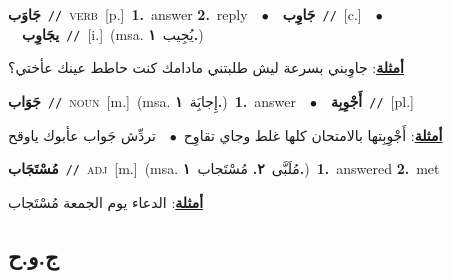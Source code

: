 \documentclass[10pt,a4paper,twoside]{article} %
\begin{document}
\begin{multicols}{2}
{\setlength\topsep{0pt}\textbf{\foreignlanguage{arabic}{جَاوَب}}\ {\color{gray}\texttt{//}\color{black}}\ \textsc{verb}\ [p.]\ \textbf{1.}~answer  \textbf{2.}~reply\ \ $\bullet$\ \ \setlength\topsep{0pt}\textbf{\foreignlanguage{arabic}{جَاوِب}}\ {\color{gray}\texttt{//}\color{black}}\ [c.]\ \ $\bullet$\ \ \setlength\topsep{0pt}\textbf{\foreignlanguage{arabic}{يجَاوِب}}\ {\color{gray}\texttt{//}\color{black}}\ [i.]\ \color{gray}(msa. \foreignlanguage{arabic}{يُجِيب}~\foreignlanguage{arabic}{\textbf{١.}})\color{black}\  \begin{flushright}\color{gray}\foreignlanguage{arabic}{\textbf{\underline{\foreignlanguage{arabic}{أمثلة}}}: جاوِبني بسرعة ليش طلبتني مادامك كنت حاطط عينك عأختي؟}\end{flushright}\color{black}} \vspace{2mm}

{\setlength\topsep{0pt}\textbf{\foreignlanguage{arabic}{جَوَاب}}\ {\color{gray}\texttt{//}\color{black}}\ \textsc{noun}\ [m.]\ \color{gray}(msa. \foreignlanguage{arabic}{إِجابَِة}~\foreignlanguage{arabic}{\textbf{١.}})\color{black}\ \textbf{1.}~answer\ \ $\bullet$\ \ \setlength\topsep{0pt}\textbf{\foreignlanguage{arabic}{أَجْوِبِة}}\ {\color{gray}\texttt{//}\color{black}}\ [pl.]\  \begin{flushright}\color{gray}\foreignlanguage{arabic}{\textbf{\underline{\foreignlanguage{arabic}{أمثلة}}}: أَجْوِبِتها بالامتحان كلها غلط وجاي تقاوِح\ $\bullet$\ \  تردِّش جَواب عأبوك ياوقح}\end{flushright}\color{black}} \vspace{2mm}

{\setlength\topsep{0pt}\textbf{\foreignlanguage{arabic}{مُسْتَجَاب}}\ {\color{gray}\texttt{//}\color{black}}\ \textsc{adj}\ [m.]\ \color{gray}(msa. \foreignlanguage{arabic}{مُلَبَّى}~\foreignlanguage{arabic}{\textbf{٢.}}  \foreignlanguage{arabic}{مُسْتَجاب}~\foreignlanguage{arabic}{\textbf{١.}})\color{black}\ \textbf{1.}~answered  \textbf{2.}~met\  \begin{flushright}\color{gray}\foreignlanguage{arabic}{\textbf{\underline{\foreignlanguage{arabic}{أمثلة}}}: الدعاء يوم الجمعة مُسْتَجاب}\end{flushright}\color{black}} \vspace{2mm}

\vspace{-3mm}
\subsection*{\color{blue}\foreignlanguage{arabic}{ج.و.ح}\color{blue}{}} 


\end{multicols}
\end{document}
